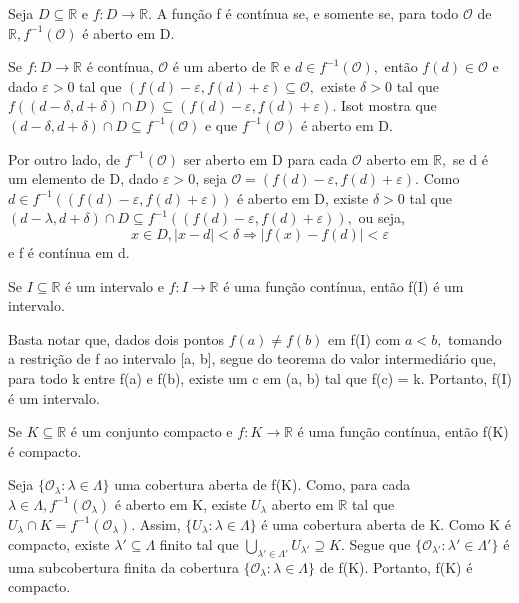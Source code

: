 \documentclass[Analysis/analysis_notes.tex]{subfiles}
\begin{document}
\begin{theorem*}
	Seja $D\subseteq{\mathbb{R}}$ e $f:D\rightarrow \mathbb{R}.$ A função f é contínua se, e somente se, para todo
	$\mathcal{O}$ de $\mathbb{R}, f^{-1}(\mathcal{O})$ é aberto em D.
\end{theorem*}
\begin{proof*}
	Se $f:D\rightarrow \mathbb{R}$ é contínua, $\mathcal{O}$ é um aberto de $\mathbb{R}$ e $d\in f^{-1}(\mathcal{O}),$
	então $f(d)\in \mathcal{O}$ e dado $\varepsilon  > 0$ tal que $(f(d)-\varepsilon , f(d)+\varepsilon )\subseteq{\mathcal{O}},$
	existe $\delta >0$ tal que $f((d-\delta , d+\delta )\cap D)\subseteq{(f(d)-\varepsilon , f(d)+\varepsilon ).}$ Isot mostra que
	$(d-\delta , d+\delta )\cap D\subseteq{f^{-1}(\mathcal{O})}$ e que $f^{-1}(\mathcal{O})$ é aberto em D.

	Por outro lado, de $f^{-1}(\mathcal{O})$ ser aberto em D para cada $\mathcal{O}$ aberto em $\mathbb{R},$ se d é um elemento
	de D, dado $\varepsilon  > 0$, seja $\mathcal{O} = (f(d)-\varepsilon , f(d)+\varepsilon ).$ Como $d\in f^{-1}((f(d)-\varepsilon , f(d)+\varepsilon ))$
	é aberto em D, existe $\delta >0$ tal que $(d-\lambda , d+\delta )\cap D\subseteq{f^{-1}((f(d)-\varepsilon , f(d)+\varepsilon ))},$
	ou seja,
	$$
		x\in D, |x-d| < \delta \Rightarrow |f(x)-f(d)| < \varepsilon
	$$
	e f é contínua em d. \qedsymbol
\end{proof*}
\begin{theorem*}
	Se $I\subseteq{\mathbb{R}}$ é um intervalo e $f:I\rightarrow \mathbb{R}$ é uma função contínua, então f(I) é um intervalo.
\end{theorem*}
\begin{proof*}
	Basta notar que, dados dois pontos $f(a)\neq f(b)$ em f(I) com $a < b,$ tomando a restrição de f ao intervalo [a, b],
	segue do teorema do valor intermediário que, para todo k entre f(a) e f(b), existe um c em (a, b) tal que f(c) = k. Portanto,
	f(I) é um intervalo. \qedsymbol
\end{proof*}
\begin{theorem*}
	Se $K\subseteq{\mathbb{R}}$ é um conjunto compacto e $f:K\rightarrow \mathbb{R}$ é uma função contínua, então f(K) é compacto.
\end{theorem*}
\begin{proof*}
	Seja $\{\mathcal{O}_{\lambda }:\lambda \in\Lambda \}$ uma cobertura aberta de f(K). Como, para cada $\lambda \in \Lambda, f^{-1}(\mathcal{O}_{\lambda })$
	é aberto em K, existe $U_{\lambda }$ aberto em $\mathbb{R}$ tal que $U_{\lambda }\cap K = f^{-1}(\mathcal{O}_{\lambda }).$
	Assim, $\{U_{\lambda }:\lambda \in\Lambda \}$ é uma cobertura aberta de K. Como K é compacto, existe $\lambda '\subseteq{\Lambda }$
	finito tal que $\bigcup_{\lambda '\in\Lambda '}^{}{U_{\lambda '}}\supseteq{K}.$ Segue que $\{\mathcal{O}_{\lambda '}: \lambda '\in\Lambda '\}$
	é uma subcobertura finita da cobertura $\{\mathcal{O}_{\lambda }:\lambda \in \Lambda \}$ de f(K). Portanto, f(K) é compacto. \qedsymbol
\end{proof*}
\end{document}
